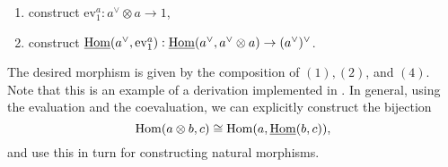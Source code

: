 \begin{example}
\begin{enumerate}
  \item construct $\mathrm{ev}^{a}_1: a^{\vee} \otimes a \rightarrow 1$,
  \item construct $\underline{\operatorname{\mathrm{Hom}}}( a^{\vee}, \mathrm{ev}^{a}_1 ): \underline{\operatorname{\mathrm{Hom}}}(a^{\vee}, a^{\vee} \otimes a) \rightarrow (a^{\vee})^{\vee}$.
 \end{enumerate}
 The desired morphism is given by the composition of $(1), (2)$, and $(4)$. Note that
 this is an example of a derivation implemented in \CapPkg.
 In general, using the evaluation and the coevaluation, we can explicitly construct the bijection
 \[
  \operatorname{\mathrm{Hom}}( a \otimes b, c ) \cong \operatorname{\mathrm{Hom}}( a, \underline{\operatorname{\mathrm{Hom}}}(b,c) ),
 \]
 and use this in turn for constructing natural morphisms.
\end{example}